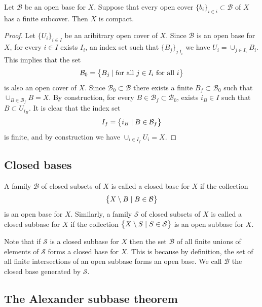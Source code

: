 \documentclass[11pt,a4paper]{article}
\begin{document}
\begin{proposition}
  Let $\mathcal B$ be an open base for $X$. Suppose that every open cover
  $\{b_i\}_{i \in i} \subset \mathcal B$ of $X$ has a finite subcover. 
  Then $X$ is compact.
\end{proposition}
\begin{proof}
  Let $\{U_i\}_{i \in I}$ be an aribitrary open cover of $X$. Since
  $\mathcal B$ is an open base for $X$, for every $i \in I$ exists
  $I_i$, an index set such that $\{B_j\}_{j \ I_i}$ we have
  $U_i = \cup_{j \in I_i} B_i$. This implies that the set
  \[
    \mathcal B_0 = \left\{B_j \mid \text{for all $j \in I_i$ for all $i$}\right\}
  \]
  is also an open cover of $X$. Since $\mathcal B_0 \subset \mathcal B$
  there exists a finite $B_f \subset \mathcal B_0$ such that
  $\cup_{B \in \mathcal B_f} B = X$. By construction, for every
  $B \in \mathcal B_f \subset \mathcal B_0$, exists $i_B \in I$ such
  that $B \subset U_{i_B}$. It is clear that the index set
  \[
    I_f = \left\{i_B \mid B \in \mathcal B_f\right\}
  \]
  is finite, and by construction we have $\cup_{i \in I_f} U_i = X$.
\end{proof}

\subsection{Closed bases}

\begin{definition}
  A family $\mathcal{B}$ of closed subsets of $X$ is called a 
  closed base for $X$ if the collection
  \[
    \left\{X \setminus B \mid B \in \mathcal B\right\}
  \]
  is an open base for $X$. Similarly, a family $\mathcal S$ of
  closed subsets of $X$ is called a closed subbase for $X$ 
  if the collection $\left\{X \setminus S \mid S \in \mathcal S\right\}$ is 
  an open subbase for $X$.
\end{definition}

\begin{remark}
  Note that if $\mathcal S$ is a closed subbase for $X$ then the set 
  $\mathcal{B}$ of all finite unions of elements of $\mathcal S$ forms 
  a closed base for $X$. This is because by definition,
  the set of all finite intersections of an open subbase forms an open 
  base. We call $\mathcal B$ the closed base generated by 
  $\mathcal S$.
\end{remark}

\subsection{The Alexander subbase theorem}
\end{document}
